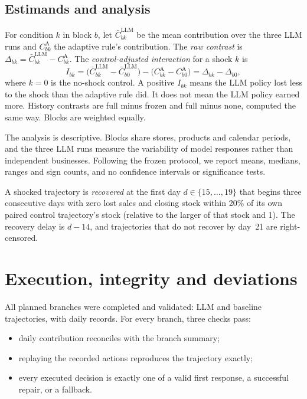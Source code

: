 \documentclass[runningheads]{llncs}
\begin{document}
\subsection{Estimands and analysis}

For condition $k$ in block $b$, let $\bar C^{\text{LLM}}_{bk}$ be the mean contribution over the three LLM runs and $C^{\text{A}}_{bk}$ the adaptive rule's contribution. The \emph{raw contrast} is $\Delta_{bk} = \bar C^{\text{LLM}}_{bk} - C^{\text{A}}_{bk}$. The \emph{control-adjusted interaction} for a shock $k$ is
\begin{equation}
I_{bk} = \bigl(\bar C^{\text{LLM}}_{bk} - \bar C^{\text{LLM}}_{b0}\bigr) - \bigl(C^{\text{A}}_{bk} - C^{\text{A}}_{b0}\bigr) = \Delta_{bk} - \Delta_{b0},
\end{equation}
where $k=0$ is the no-shock control. A positive $I_{bk}$ means the LLM policy lost less to the shock than the adaptive rule did. It does not mean the LLM policy earned more. History contrasts are full minus frozen and full minus none, computed the same way. Blocks are weighted equally.

The analysis is descriptive. Blocks share stores, products and calendar periods, and the three LLM runs measure the variability of model responses rather than independent businesses. Following the frozen protocol, we report means, medians, ranges and sign counts, and no confidence intervals or significance tests.

A shocked trajectory is \emph{recovered} at the first day $d \in \{15,\dots,19\}$ that begins three consecutive days with zero lost sales and closing stock within 20\% of its own paired control trajectory's stock (relative to the larger of that stock and 1). The recovery delay is $d-14$, and trajectories that do not recover by day~21 are right-censored.

\section{Execution, integrity and deviations}\label{sec:execution}

All planned branches were completed and validated:  LLM and  baseline trajectories, with  daily records. For every branch, three checks pass:
\begin{itemize}
\item daily contribution reconciles with the branch summary;
\item replaying the recorded actions reproduces the trajectory exactly;
\item every executed decision is exactly one of a valid first response, a successful repair, or a fallback.
\end{itemize}
\end{document}
